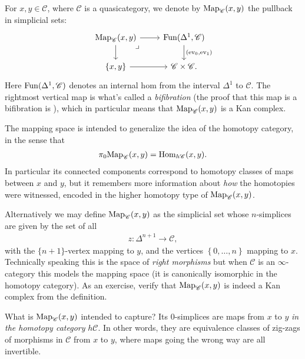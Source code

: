\documentclass[11pt,openany]{book}
\begin{document}
\begin{definition} For $x,y\in \mathscr{C}$, where $\mathscr{C}$ is a quasicategory, we denote by $\mathrm{Map}_{\mathscr{C}}(x,y)$ the pullback in simplicial sets:
\[ \begin{tikzcd}
    {\Map_{\mathscr{C}}(x,y)}\rar\dar\pb & {\Fun(\Delta^1,\mathscr{C})}\dar["{(\ev_0,\ev_1)}" right]\\
    {\{x,y\}}\rar & \mathscr{C} \times \mathscr{C}.
\end{tikzcd} \]
Here $\mathrm{Fun}(\Delta^1,\mathscr{C})$ denotes an internal hom from the interval $\Delta^1$ to $\mathscr{C}$. The rightmost vertical map is what's called a \textit{bifibration} (the proof that this map is a bifibration is \cite[2.4.7.11]{HTT}), which in particular means that $\mathrm{Map}_{\mathscr{C}}(x,y)$ is a Kan complex.
\end{definition}

\begin{intuition} The mapping space is intended to generalize the idea of the homotopy category, in the sense that
\begin{align*}
    \pi_0 \mathrm{Map}_\mathscr{C}(x,y) = \mathrm{Hom}_{h\mathscr{C}}(x,y).
\end{align*}
In particular its connected components correspond to homotopy classes of maps between $x$ and $y$, but it remembers more information about \textit{how} the homotopies were witnessed, encoded in the higher homotopy type of $\mathrm{Map}_\mathscr{C}(x,y)$.
\end{intuition}




\begin{remark} 
Alternatively we may define $\mathrm{Map}_\mathscr{C}(x,y)$ as the simplicial set whose $n$-simplices are given by the set of all
\begin{align*}
    z \colon \Delta^{n+1} \to \mathscr{C},
\end{align*}
with the $\{n+1\}$-vertex mapping to $y$, and the vertices $\left\{ 0, \ldots, n \right\}$ mapping to $x$. 
Technically speaking this is the space of \textit{right morphisms} but when $\mathscr{C}$ is an $\infty$-category this models the mapping space (it is canonically isomorphic in the homotopy category). As an exercise, verify that $\mathrm{Map}_{\mathscr{C}}(x,y)$ is indeed a Kan complex from the definition.
\end{remark}

What is $\mathrm{Map}_\mathscr{C}(x,y)$ intended to capture? Its 0-simplices are maps from $x$ to $y$ \textit{in the homotopy category} $h\mathscr{C}$. In other words, they are equivalence classes of zig-zags of morphisms in $\mathscr{C}$ from $x$ to $y$, where maps going the wrong way are all invertible.
\end{document}
